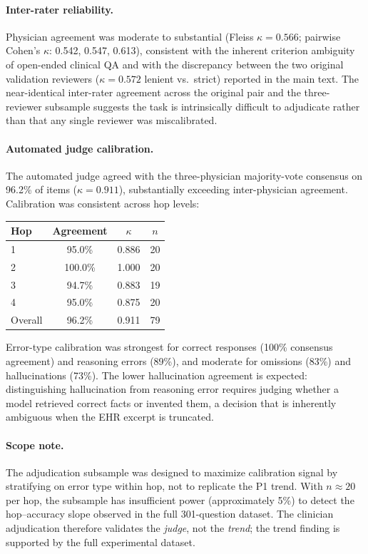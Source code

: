 \documentclass{article}
\begin{document}
\paragraph{Inter-rater reliability.}
Physician agreement was moderate to substantial (Fleiss $\kappa = 0.566$;
pairwise Cohen's $\kappa$: 0.542, 0.547, 0.613), consistent with the inherent
criterion ambiguity of open-ended clinical QA and with the discrepancy between
the two original validation reviewers ($\kappa = 0.572$ lenient vs.\ strict)
reported in the main text.
The near-identical inter-rater agreement across the original pair and the
three-reviewer subsample suggests the task is intrinsically difficult to adjudicate
rather than that any single reviewer was miscalibrated.

\paragraph{Automated judge calibration.}
The automated judge agreed with the three-physician majority-vote consensus on
96.2\% of items ($\kappa = 0.911$), substantially exceeding inter-physician agreement.
Calibration was consistent across hop levels:

\begin{center}
\small
\begin{tabular}{lccc}
\toprule
Hop & Agreement & $\kappa$ & $n$ \\
\midrule
1 & 95.0\% & 0.886 & 20 \\
2 & 100.0\% & 1.000 & 20 \\
3 & 94.7\% & 0.883 & 19 \\
4 & 95.0\% & 0.875 & 20 \\
\midrule
Overall & 96.2\% & 0.911 & 79 \\
\bottomrule
\end{tabular}
\end{center}

Error-type calibration was strongest for correct responses (100\% consensus
agreement) and reasoning errors (89\%), and moderate for omissions (83\%) and
hallucinations (73\%). The lower hallucination agreement is expected: distinguishing
hallucination from reasoning error requires judging whether a model retrieved
correct facts or invented them, a decision that is inherently ambiguous when
the EHR excerpt is truncated.

\paragraph{Scope note.}
The adjudication subsample was designed to maximize calibration signal by
stratifying on error type within hop, not to replicate the P1 trend.
With $n \approx 20$ per hop, the subsample has insufficient power (approximately
5\%) to detect the hop--accuracy slope observed in the full 301-question dataset.
The clinician adjudication therefore validates the \emph{judge}, not the
\emph{trend}; the trend finding is supported by the full experimental dataset.
\end{document}
